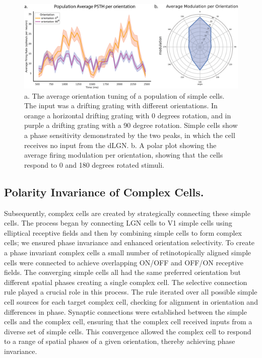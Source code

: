 \documentclass[12pt]{article}
\begin{document}
\begin{figure}[H]
    \centering
    \includegraphics[width=1.0 \textwidth]{figures/figure_simple_orientation_tuning.png}
    \caption{a. The average orientation tuning of a population of simple cells. The input was a drifting grating with different orientations. In orange a horizontal drifting grating with 0 degrees rotation, and in purple a drifting grating with a 90 degree rotation. Simple cells show a phase sensitivity demonstrated by the two peaks, in which the cell receives no input from the dLGN. b. A polar plot showing the average firing modulation per orientation, showing that the cells respond to 0 and 180 degrees rotated stimuli.}
    \label{fig:simple cell orientation tuning}
\end{figure}

\subsection{Polarity Invariance of Complex Cells.}
Subsequently, complex cells are created by strategically connecting these simple cells. The process began by connecting LGN cells to V1 simple cells using elliptical receptive fields and then by combining simple cells to form complex cells; we ensured phase invariance and enhanced orientation selectivity. To create a phase invariant complex cells a small number of retinotopically aligned simple cells were connected to achieve overlapping ON/OFF and OFF/ON receptive fields. The converging simple cells all had the same preferred orientation but different spatial phases creating a single complex cell. The selective connection rule played a crucial role in this process. The rule iterated over all possible simple cell sources for each target complex cell, checking for alignment in orientation and differences in phase. Synaptic connections were established between the simple cells and the complex cell, ensuring that the complex cell received inputs from a diverse set of simple cells. This convergence allowed the complex cell to respond to a range of spatial phases of a given orientation, thereby achieving phase invariance.
\end{document}
